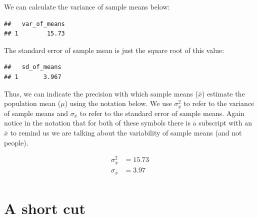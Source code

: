 \documentclass[
]{krantz}
\makeatletter
\newenvironment{Shaded}{\begin{snugshade}}{\end{snugshade}}
\newcommand{\DataTypeTok}[1]{\textcolor[rgb]{0.27,0.27,0.27}{#1}}
\newcommand{\KeywordTok}[1]{\textcolor[rgb]{0.27,0.27,0.27}{\textbf{#1}}}
\newcommand{\NormalTok}[1]{#1}
\newcommand{\OperatorTok}[1]{\textcolor[rgb]{0.43,0.43,0.43}{\textbf{#1}}}
\newcommand{\StringTok}[1]{\textcolor[rgb]{0.5,0.5,0.5}{#1}}
\newenvironment{kframe}{%
\medskip{}
\setlength{\fboxsep}{.8em}
 \def\at@end@of@kframe{}%
 \ifinner\ifhmode%
  \def\at@end@of@kframe{\end{minipage}}%
  \begin{minipage}{\columnwidth}%
 \fi\fi%
 \def\FrameCommand##1{\hskip\@totalleftmargin \hskip-\fboxsep
 \colorbox{shadecolor}{##1}\hskip-\fboxsep
     \hskip-\linewidth \hskip-\@totalleftmargin \hskip\columnwidth}%
 \MakeFramed {\advance\hsize-\width
   \@totalleftmargin\z@ \linewidth\hsize
   \@setminipage}}%
 {\par\unskip\endMakeFramed%
 \at@end@of@kframe}
\renewenvironment{Shaded}{\begin{kframe}}{\end{kframe}}
\makeatother
\begin{document}
We can calculate the variance of sample means below:

\begin{Shaded}
\end{Shaded}

\begin{verbatim}
##   var_of_means
## 1        15.73
\end{verbatim}

The standard error of sample mean is just the square root of this value:

\begin{Shaded}
\end{Shaded}

\begin{verbatim}
##   sd_of_means
## 1       3.967
\end{verbatim}

Thus, we can indicate the precision with which sample means (\(\bar{x}\)) estimate the population mean (\(\mu\)) using the notation below. We use \(\sigma_{\bar{x}}^2\) to refer to the variance of sample means and \(\sigma_{\bar{x}}\) to refer to the standard error of sample means. Again notice in the notation that for both of these symbols there is a subscript with an \(\bar{x}\) to remind us we are talking about the variability of sample means (and not people).

\[
\begin{aligned} 
\sigma_{\bar{x}}^2 &= 15.73 \\
\sigma_{\bar{x}} &= 3.97 \\
\end{aligned} 
\]

\hypertarget{a-short-cut}{%
\section{A short cut}\label{a-short-cut}}
\end{document}
